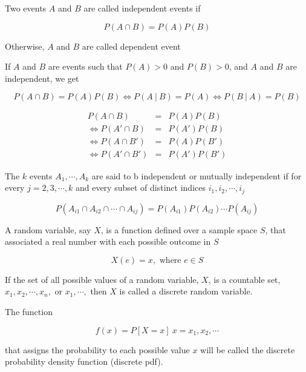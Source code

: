 \begin{defn}
	Two events $A$ and $B$ are called independent events if
	
	$$P(A \cap B) = P(A)P(B)$$
	
	Otherwise, $A$ and $B$ are called dependent event
\end{defn}

\begin{thm*}
	If $A$ and $B$ are events such that $P(A) > 0$ and $P(B) > 0$, and $A$ and $B$ are independent, we get
	
	$$P(A \cap B) = P(A)P(B) \Leftrightarrow P(A~|~B) = P(A) \Leftrightarrow P(B~|~A) = P(B)$$
\end{thm*}

\begin{thm*}
	\begin{eqnarray*}
		P(A \cap B) &=& P(A)P(B)\\
		\Leftrightarrow P(A' \cap B) &=& P(A')P(B)\\
		\Leftrightarrow P(A \cap B') &=& P(A)P(B')\\ 
		\Leftrightarrow P(A' \cap B') &=& P(A')P(B')
	\end{eqnarray*}
\end{thm*}


\begin{defn}
	The $k$ events $A_1,\cdots,A_k$ are said to b independent or mutually independent if for every $j = 2,3,\cdots ,k$ and every subset of distinct indices $i_1,i_2,\cdots,i_j$
	
	$$P(A_{i1} \cap A_{i2} \cap \cdots \cap A_{ij}) = P(A_{i1})P(A_{i2})\cdots P(A_{ij})$$
\end{defn}

\begin{defn}
	A random variable, say $X$, is a function defined over a sample space $S$, that associated a real number with each possible outcome in $S$
	
	$$X(e) = x, \text{ where } e \in S$$
\end{defn}

\begin{defn}
	If the set of all possible values of a random variable, $X$, is a countable set, $x_1,x_2,\cdots,x_n,$ or $x_1,\cdots,$ then $X$ is called a discrete random variable.
	
	The function
	
	$$f(x) = P[X = x]~ x = x_1,x_2,\cdots$$
	
	that assigns the probability to each possible value $x$ will be called the discrete probability density function (discrete pdf).
\end{defn}

